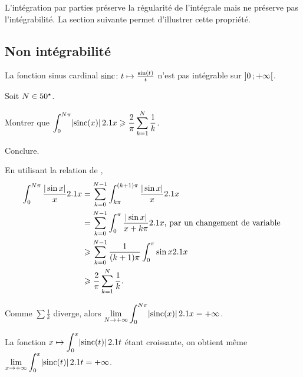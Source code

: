 \begin{remarque}
L'intégration par parties préserve la régularité de l'intégrale mais ne préserve pas l'intégrabilité. La section suivante permet d'illustrer cette propriété.
\end{remarque}

\subsection{Non intégrabilité}

\begin{prop}
    La fonction sinus cardinal $\fonctionligne[\mathrm{sinc}]{t}{\frac{\sin(t)}{t}}$ n'est pas intégrable sur $\interoo{0}{+\infty}$.
\end{prop}

\begin{exercice}
Soit $N \in \Ne$.
\begin{questions}
\item Montrer que $\displaystyle\int_0^{N\pi} \module{\mathrm{sinc}(x)} \d x \geqslant \frac{2}{\pi} \sum_{k=1}^N \frac{1}{k}$.

\item Conclure.
\end{questions}
\end{exercice}

\begin{demo}
\begin{reponses}
\item En utilisant la relation de ,
    \begin{align*}
        \int_0^{N \pi} \frac{|\sin x|}{x} \d x &= \sum_{k=0}^{N-1} \int_{k \pi}^{(k+1) \pi} \frac{|\sin x|}{x} \d x \\
&= \sum_{k=0}^{N-1} \int_0^\pi \frac{|\sin x|}{x + k \pi} \d x        \text{, par un changement de variable }  \\
        &\geqslant \sum_{k=0}^{N-1} \frac{1}{(k+1) \pi} \int_0^\pi \sin x \d x \\
        &\geqslant \frac{2}{\pi} \sum_{k=1}^N \frac{1}{k}.
        \end{align*}

\item Comme $\sum \frac{1}{k}$ diverge, alors $\displaystyle\lim\limits_{N\to+\infty} \int_0^{N\pi} \module{\mathrm{sinc}(x)} \d x = +\infty$.

La fonction $x \mapsto \displaystyle\int_0^x \module{\mathrm{sinc}(t)} \d t$ étant croissante, on obtient même $\displaystyle \lim_{x\to+\infty} \int_0^x \module{\mathrm{sinc}(t)} \d t = +\infty$.
\end{reponses}
\end{demo}


